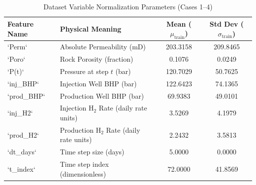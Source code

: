 \begin{table}[h]
\centering
\caption{Dataset Variable Normalization Parameters (Cases 1--4)}
\label{tab:dataset_stats}
\begin{tabular}{llcc}
\toprule
\textbf{Feature Name} & \textbf{Physical Meaning} & \textbf{Mean ($\mu_{\text{train}}$)} & \textbf{Std Dev ($\sigma_{\text{train}}$)} \\
\midrule
`Perm` & Absolute Permeability (mD) & 203.3158 & 209.8465 \\
`Poro` & Rock Porosity (fraction) & 0.1076 & 0.0249 \\
`P(t)` & Pressure at step $t$ (bar) & 120.7029 & 50.7625 \\
`inj\_BHP` & Injection Well BHP (bar) & 122.6423 & 74.1365 \\
`prod\_BHP` & Production Well BHP (bar) & 69.9383 & 49.0101 \\
`inj\_H2` & Injection H$_2$ Rate (daily rate units) & 3.5269 & 4.1979 \\
`prod\_H2` & Production H$_2$ Rate (daily rate units) & 2.2432 & 3.5813 \\
`dt\_days` & Time step size (days) & 5.0000 & 0.0000 \\
`t\_index` & Time step index (dimensionless) & 72.0000 & 41.8569 \\
\bottomrule
\end{tabular}
\end{table}
